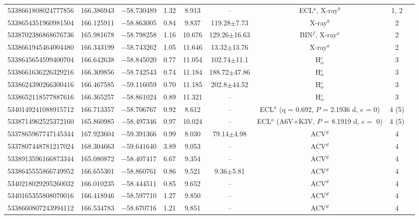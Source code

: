 \documentclass[11pt]{article}
\begin{document}
\begin{table}[htbp]
{\begin{tabular}{ccccccccc}
        5338661808024777856 & 166.386943 & $-$58.730489 & 1.32 & 8.913 & --  & ECL$^a$, X-ray$^b$ & 1, 2 \\ 
        5338654351960981504 & 166.125911 & $-$58.863005 & 0.84 & 9.837 & 119.28$\pm$7.73 & X-ray$^b$ & 2 \\ 
        5338702386868676736 & 165.981678 & $-$58.798258 & 1.16 & 10.676 & 129.26$\pm$16.63 & BIN$^f$, X-ray$^a$ & 2 \\ 
        5338661945464004480 & 166.343199 & $-$58.743262 & 1.05 & 11.646 & 13.32$\pm$13.76  & X-ray$^a$ & 2 \\ 
        5338645654599400704 & 166.642638 & $-$58.845020 & 0.77 & 11.054 & 102.74$\pm$11.1  & H$_{\alpha}^c$ & 3 \\ 
        5338661636226329216 & 166.309856 & $-$58.742543 & 0.74 & 11.184 & 188.72$\pm$47.86  & H$_{\alpha}^c$ & 3 \\ 
        5338624390266300416 & 166.467585 & $-$59.116059 & 0.70 & 11.185 & 202.8$\pm$44.52  & H$_{\alpha}^c$ & 3 \\ 
        5338652118577887616 & 166.365257 & $-$58.861024 & 0.89 & 11.321 & --  & H$_{\alpha}^c$ & 3 \\ 
        5340149241088915712 & 166.713357 & $-$58.706767 & 0.92 & 8.612 & --  & \makecell[c]{ECL$^a$ \\ (q = 0.692, $P$ = 2.1936 d, $e$ = 0)} & 4 (5) \\ 
        5338714962525372160 & 165.860985 & $-$58.497346 & 0.97 & 10.024 & -- &  \makecell[c]{ECL$^a$ \\ (A6V$+$K3V, $P$ = 8.1919 d, $e =$ 0)} & 4 (5) \\ 
        5337865967747145344 & 167.923604 & $-$59.391366 & 0.99 & 8.030 & 79.14$\pm$4.98 &  ACV$^d$ & 4 \\ 
        5337807448781217024 & 168.304663 & $-$59.641640 & 3.89 & 9.053 & -- & ACV$^d$ & 4 \\ 
        5338913596166873344 & 165.080872 & $-$58.407417 & 6.67 & 9.354 & -- & ACV$^d$ & 4 \\ 
        5338645555866749952 & 166.655301 & $-$58.860761 & 0.86 & 9.521 & 9.36$\pm$5.81 &  ACV$^d$ & 4 \\ 
        5340218029295260032 & 166.010235 & $-$58.444511 & 0.85 & 9.652 & -- &  ACV$^d$ & 4 \\ 
        5340165355808070016 & 166.418946 & $-$58.597710 & 1.27 & 9.850 & -- &  ACV$^d$ & 4 \\ 
        5338660807243994112 & 166.534783 & $-$58.670716 & 1.21 & 9.851 & -- &  ACV$^d$ & 4 \\ 

\end{tabular}}
\end{table}
\end{document}
